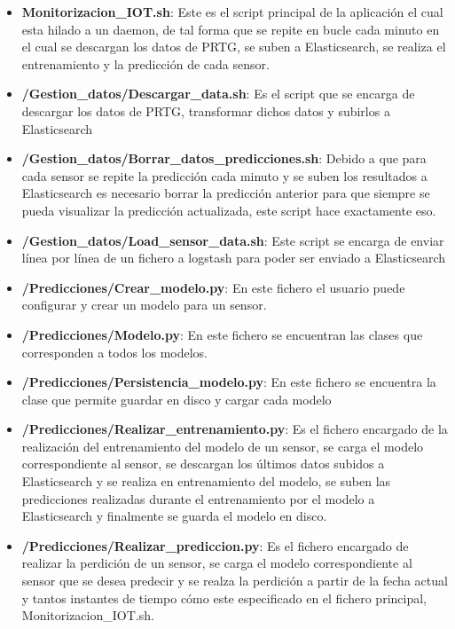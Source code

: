 \begin{itemize}
    \item \textbf{Monitorizacion\_IOT.sh}: Este es el script principal de la aplicación el cual esta hilado a un daemon, de tal forma que se repite en bucle cada minuto en el cual se descargan los datos de PRTG, se suben a Elasticsearch, se realiza el entrenamiento y la predicción de cada sensor.
    
    \item \textbf{/Gestion\_datos/Descargar\_data.sh}: Es el script que se encarga de descargar los datos de PRTG, transformar dichos datos y subirlos a Elasticsearch
    
    \item \textbf{/Gestion\_datos/Borrar\_datos\_predicciones.sh}: Debido a que para cada sensor se repite la predicción cada minuto y se suben los resultados a Elasticsearch es necesario borrar la predicción anterior para que siempre se pueda visualizar la predicción actualizada, este script hace exactamente eso.
    
    \item \textbf{/Gestion\_datos/Load\_sensor\_data.sh}: Este script se encarga de enviar línea por línea de un fichero a logstash para poder ser enviado a Elasticsearch
    
    \item \textbf{/Predicciones/Crear\_modelo.py}: En este fichero el usuario puede configurar y crear un modelo para un sensor.
    
    \item \textbf{/Predicciones/Modelo.py}: En este fichero se encuentran las clases que corresponden a todos los modelos.
    
    \item \textbf{/Predicciones/Persistencia\_modelo.py}: En este fichero se encuentra la clase que permite guardar en disco y cargar cada modelo
    
    \item \textbf{/Predicciones/Realizar\_entrenamiento.py}: Es el fichero encargado de la realización del entrenamiento del modelo de un sensor, se carga el modelo correspondiente al sensor, se descargan los últimos datos subidos a Elasticsearch y se realiza en entrenamiento del modelo, se suben las predicciones realizadas durante el entrenamiento por el modelo a Elasticsearch y finalmente se guarda el modelo en disco.
    
    \item \textbf{/Predicciones/Realizar\_prediccion.py}: Es el fichero encargado de realizar la perdición de un sensor, se carga el modelo correspondiente al sensor que se desea predecir y se realza la perdición a partir de la fecha actual y tantos instantes de tiempo cómo este especificado en el fichero principal, Monitorizacion\_IOT.sh.
    

\end{itemize}
